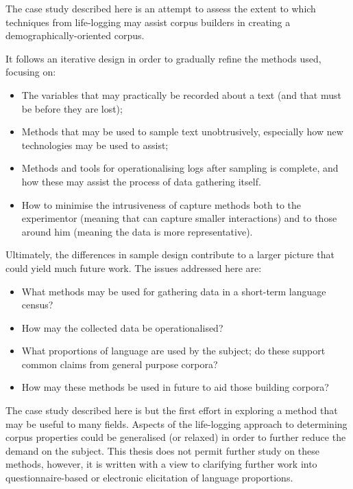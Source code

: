 
The case study described here is an attempt to assess the extent to which techniques from life-logging may assist corpus builders in creating a demographically-oriented corpus.

It follows an iterative design in order to gradually refine the methods used, focusing on:

\begin{itemize}
    \item The variables that may practically be recorded about a text (and that must be before they are lost);
    \item Methods that may be used to sample text unobtrusively, especially how new technologies may be used to assist;
    \item Methods and tools for operationalising logs after sampling is complete, and how these may assist the process of data gathering itself.
    \item How to minimise the intrusiveness of capture methods both to the experimentor (meaning that can capture smaller interactions) and to those around him (meaning the data is more representative).
\end{itemize}


Ultimately, the differences in sample design contribute to a larger picture that could yield much future work.  The issues addressed here are:

\begin{itemize}
    \item What methods may be used for gathering data in a short-term language census?
    \item How may the collected data be operationalised?
    \item What proportions of language are used by the subject; do these support common claims from general purpose corpora?
    \item How may these methods be used in future to aid those building corpora?
\end{itemize}


The case study described here is but the first effort in exploring a method that may be useful to many fields.  Aspects of the life-logging approach to determining corpus properties could be generalised (or relaxed) in order to further reduce the demand on the subject.  This thesis does not permit further study on these methods, however, it is written with a view to clarifying further work into questionnaire-based or electronic elicitation of language proportions.






